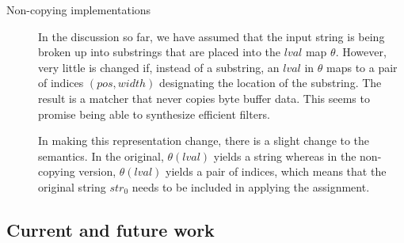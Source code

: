 \documentclass[svgnames]{llncs}
\newcommand{\lval}{\ensuremath{\mathit{lval}}}
\begin{document}
\begin{description}
\item [Non-copying implementations] In the discussion so far, we have
  assumed that the input string is being broken up into substrings
  that are placed into the \lval{} map $\theta$. However, very little
  is changed if, instead of a substring, an \lval{} in $\theta$ maps
  to a pair of indices $(\mathit{pos},\mathit{width})$ designating the
  location of the substring. The result is a matcher that never copies
  byte buffer data. This seems to promise being able to synthesize
  efficient filters.

  In making this representation change, there is a slight change to
  the semantics. In the original, $\theta(\lval)$ yields a string
  whereas in the non-copying version, $\theta(\lval)$ yields a pair of
  indices, which means that the original string $\mathit{str}_0$ needs
  to be included in applying the assignment.
\end{description}

\subsection{Current and future work}
\end{document}
